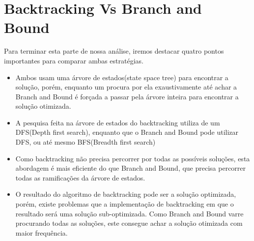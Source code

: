 \section{Backtracking Vs Branch and Bound}

Para terminar esta parte de nossa análise, iremos destacar quatro 
pontos importantes para comparar ambas estratégias.

\begin{itemize}
    \item Ambos usam uma árvore de estados(state space tree) para encontrar 
    a solução, porém, enquanto um procura por ela exaustivamente até achar a Branch 
    and Bound é forçada a passar pela árvore inteira para encontrar a solução otimizada.
    \item A pesquisa feita na árvore de estados do backtracking utiliza 
    de um DFS(Depth first search), enquanto que o Branch and Bound pode utilizar 
    DFS, ou até mesmo BFS(Breadth first search)
    \item Como backtracking não precisa percorrer por todas as 
    possíveis soluções, esta abordagem é mais eficiente do que Branch and Bound,
    que precisa percorrer todas as ramificações da árvore de estados.
    \item O resultado do algoritmo de backtracking pode ser a solução optimizada,
    porém, existe problemas que a implementação de backtracking em que o resultado 
    será uma solução sub-optimizada. Como Branch and Bound varre procurando todas as 
    soluções, este consegue achar a solução otimizada com maior frequência.
\end{itemize}